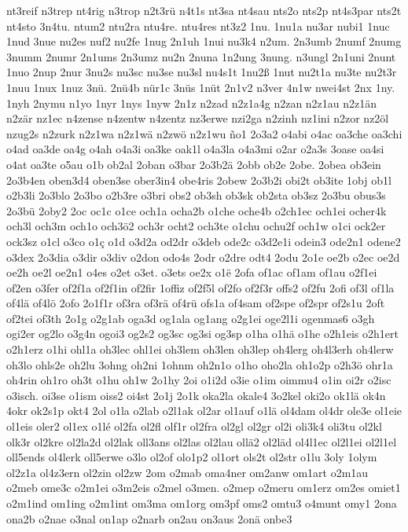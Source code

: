 {nt3reif
n3trep
nt4rig
n3trop
n2t3rü
n4t1s
nt3sa
nt4sau
nts2o
nts2p
nt4s3par
nts2t
nt4sto
3n4tu.
ntum2
ntu2ra
ntu4re.
ntu4res
nt3z2
1nu.
1nu1a
nu3ar
nubi1
1nuc
1nud
3nue
nu2es
nuf2
nu2fe
1nug
2n1uh
1nui
nu3k4
n2um.
2n3umb
2numf
2numg
3numm
2numr
2n1ums
2n3umz
nu2n
2nuna
1n2ung
3nung.
n3ungl
2n1uni
2nunt
1nuo
2nup
2nur
3nu2s
nu3sc
nu3se
nu3sl
nu4s1t
1nu2ß
1nut
nu2t1a
nu3te
nu2t3r
1nuu
1nux
1nuz
3nü.
2nü4b
nür1c
3nüs
1nüt
2n1v2
n3ver
4n1w
nwei4st
2nx
1ny.
1nyh
2nymu
n1yo
1nyr
1nys
1nyw
2n1z
n2zad
n2z1a4g
n2zan
n2z1au
n2z1än
n2zär
nz1ec
n4zense
n4zentw
n4zentz
nz3erwe
nzi2ga
n2zinh
nz1ini
n2zor
nz2öl
nzug2s
n2zurk
n2z1wa
n2z1wä
n2zwö
n2z1wu
ño1
2o3a2
o4abi
o4ac
oa3che
oa3chi
o4ad
oa3de
oa4g
o4ah
o4a3i
oa3ke
oak1l
o4a3la
o4a3mi
o2ar
o2a3s
3oase
oa4si
o4at
oa3te
o5au
o1b
ob2al
2oban
o3bar
2o3b2ä
2obb
ob2e
2obe.
2obea
ob3ein
2o3b4en
oben3d4
oben3se
ober3in4
obe4ris
2obew
2o3b2i
obi2t
ob3ite
1obj
ob1l
o2b3li
2o3blo
2o3bo
o2b3re
o3bri
obs2
ob3sh
ob3sk
ob2sta
ob3sz
2o3bu
obus3s
2o3bü
2oby2
2oc
oc1c
o1ce
och1a
ocha2b
o1che
oche4b
o2ch1ec
och1ei
ocher4k
och3l
och3m
och1o
och3ö2
och3r
ocht2
och3te
o1chu
ochu2f
och1w
o1ci
ock2er
ock3sz
o1cl
o3co
o1ç
o1d
o3d2a
od2dr
o3deb
ode2c
o3d2e1i
odein3
ode2n1
odene2
o3dex
2o3dia
o3dir
o3div
o2don
odo4s
2odr
o2dre
odt4
2odu
2o1e
oe2b
o2ec
oe2d
oe2h
oe2l
oe2n1
o4es
o2et
o3et.
o3ets
oe2x
o1ë
2ofa
of1ac
of1am
of1au
o2f1ei
of2en
o3fer
of2f1a
of2f1in
of2fir
1offiz
of2f5l
of2fo
of2f3r
offs2
of2fu
2ofi
of3l
of1la
of4lä
of4lö
2ofo
2o1f1r
of3ra
of3rä
of4rü
ofs1a
of4sam
of2spe
of2spr
of2s1u
2oft
of2tei
of3th
2o1g
o2g1ab
oga3d
og1ala
og1ang
o2g1ei
oge2l1i
ogenmas6
o3gh
ogi2er
og2lo
o3g4n
ogoi3
og2s2
og3sc
og3si
og3sp
o1ha
o1hä
o1he
o2h1eis
o2h1ert
o2h1erz
o1hi
ohl1a
oh3lec
ohl1ei
oh3lem
oh3len
oh3lep
oh4lerg
oh4l3erh
oh4lerw
oh3lo
ohls2e
oh2lu
3ohng
oh2ni
1ohnm
oh2n1o
o1ho
oho2la
oh1o2p
o2h3ö
ohr1a
oh4rin
oh1ro
oh3t
o1hu
oh1w
2o1hy
2oi
o1i2d
o3ie
o1im
oimmu4
o1in
oi2r
o2isc
o3isch.
oi3se
o1ism
oiss2
oi4st
2o1j
2o1k
oka2la
okale4
3o2kel
oki2o
ok1lä
ok4n
4okr
ok2s1p
okt4
2ol
o1la
o2lab
o2l1ak
ol2ar
ol1auf
o1lä
ol4dam
ol4dr
ole3e
ol1eie
ol1eis
oler2
ol1ex
o1lé
ol2fa
ol2fl
olf1r
ol2fra
ol2gl
ol2gr
ol2i
oli3k4
oli3tu
ol2kl
olk3r
ol2kre
ol2la2d
ol2lak
oll3ans
ol2las
ol2lau
ollä2
ol2läd
ol4l1ec
ol2l1ei
ol2l1el
oll5ends
ol4lerk
oll5erwe
o3lo
ol2of
olo1p2
ol1ort
ols2t
ol2str
o1lu
3oly
1olym
ol2z1a
ol4z3ern
ol2zin
ol2zw
2om
o2mab
oma4ner
om2anw
om1art
o2m1au
o2meb
ome3c
o2m1ei
o3m2eis
o2mel
o3men.
o2mep
o2meru
om1erz
om2es
omiet1
o2m1ind
om1ing
o2m1int
om3ma
om1org
om3pf
oms2
omtu3
o4munt
omy1
2ona
ona2b
o2nae
o3nal
on1ap
o2narb
on2au
on3aus
2onä
onbe3
}
